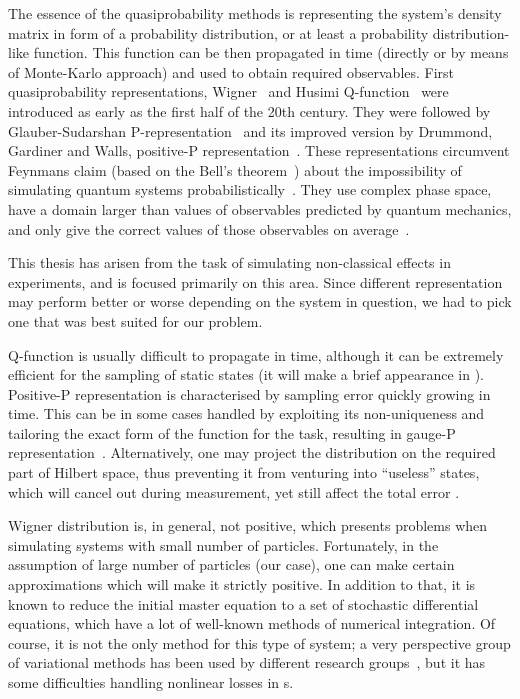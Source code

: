 The essence of the quasiprobability methods is representing the system's density matrix in form of a probability distribution, or at least a probability distribution-like function.
This function can be then propagated in time (directly or by means of Monte-Karlo approach) and used to obtain required observables.
First quasiprobability representations, Wigner~\cite{Wigner1932,Dirac1945,Moyal1947} and Husimi Q-function~\cite{Husimi1940} were introduced as early as the first half of the 20th century.
They were followed by Glauber-Sudarshan P-representation~\cite{Sudarshan1963,Glauber1963b,Glauber1963} and its improved version by Drummond, Gardiner and Walls, positive-P representation~\cite{Drummond1980,Drummond1981}.
These representations circumvent Feynmans claim (based on the Bell's theorem~\cite{Bell1964}) about the impossibility of simulating quantum systems probabilistically~\cite{Feynman1982}.
They use complex phase space, have a domain larger than values of observables predicted by quantum mechanics, and only give the correct values of those observables on average~\cite{Reid2013}.

This thesis has arisen from the task of simulating non-classical effects in  experiments, and is focused primarily on this area.
Since different representation may perform better or worse depending on the system in question, we had to pick one that was best suited for our problem.

Q-function is usually difficult to propagate in time, although it can be extremely efficient for the sampling of static states (it will make a brief appearance in ).
Positive-P representation is characterised by sampling error quickly growing in time.
This can be in some cases handled by exploiting its non-uniqueness and tailoring the exact form of the function for the task, resulting in gauge-P representation~\cite{Deuar2002}.
Alternatively, one may project the distribution on the required part of Hilbert space, thus preventing it from venturing into ``useless'' states, which will cancel out during measurement, yet still affect the total error .

Wigner distribution is, in general, not positive, which presents problems when simulating systems with small number of particles.
Fortunately, in the assumption of large number of particles (our case), one can make certain approximations which will make it strictly positive.
In addition to that, it is known to reduce the initial master equation to a set of stochastic differential equations, which have a lot of well-known methods of numerical integration.
Of course, it is not the only method for this type of system; a very perspective group of variational methods has been used by different research groups~\cite{Li2008,Li2009,Sinatra2011},
but it has some difficulties handling nonlinear losses in s.


